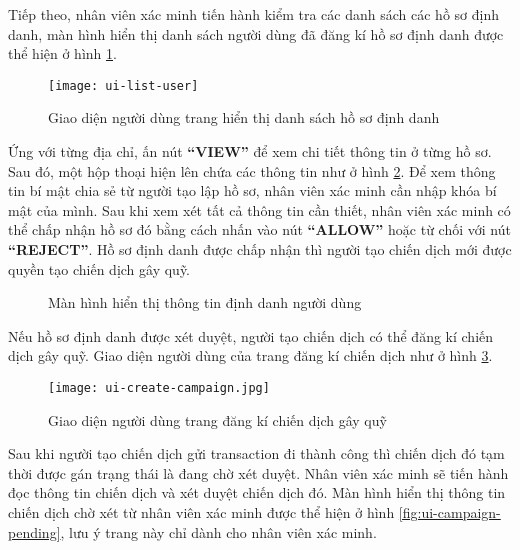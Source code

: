 \documentclass[../main-report.tex]{subfiles}
\begin{document}
Tiếp theo, nhân viên xác minh tiến hành kiểm tra các danh sách các hồ sơ định danh, màn hình hiển thị danh sách người dùng đã đăng kí hồ sơ định danh được thể hiện ở hình \ref{fig:ui-list-user}.

\begin{figure}[ht!]
\begin{center}
\label{fig:ui-list-user}
\texttt{[image: ui-list-user]}
\caption{Giao diện người dùng trang hiển thị danh sách hồ sơ định danh}
\end{center}
\end{figure}

Ứng với từng địa chỉ, ấn nút \textbf{``VIEW''} để xem chi tiết thông tin ở từng hồ sơ. Sau đó, một hộp thoại hiện lên chứa các thông tin như ở hình \ref{fig:ui-identity-view}. Để xem thông tin bí mật chia sẻ từ người tạo lập hồ sơ, nhân viên xác minh cần nhập khóa bí mật của mình. Sau khi xem xét tất cả thông tin cần thiết, nhân viên xác minh có thể chấp nhận hồ sơ đó bằng cách nhấn vào nút \textbf{``ALLOW''} hoặc từ chối với nút \textbf{``REJECT''}. Hồ sơ định danh được chấp nhận thì người tạo chiến dịch mới được quyền tạo chiến dịch gây quỹ.

\begin{figure}[ht!]
\begin{center}
\label{fig:ui-identity-view}
\caption{Màn hình hiển thị thông tin định danh người dùng}
\end{center}
\end{figure}

Nếu hồ sơ định danh được xét duyệt, người tạo chiến dịch có thể đăng kí chiến dịch gây quỹ. Giao diện người dùng của trang đăng kí chiến dịch như ở hình \ref{fig:ui-create-campaign}.

\begin{figure}[ht!]
\begin{center}
\label{fig:ui-create-campaign}
\texttt{[image: ui-create-campaign.jpg]}
\caption{Giao diện người dùng trang đăng kí chiến dịch gây quỹ}
\end{center}
\end{figure}

Sau khi người tạo chiến dịch gửi transaction đi thành công thì chiến dịch đó tạm thời được gán trạng thái là đang chờ xét duyệt. Nhân viên xác minh sẽ tiến hành đọc thông tin chiến dịch và xét duyệt chiến dịch đó. Màn hình hiển thị thông tin chiến dịch chờ xét từ nhân viên xác minh được thể hiện ở hình \ref{fig:ui-campaign-pending}, lưu ý trang này chỉ dành cho nhân viên xác minh.
\end{document}
